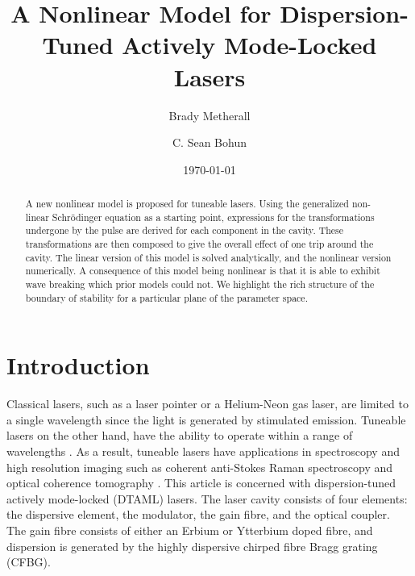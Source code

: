 \documentclass[%
 aps,
 jmp,%
 amsmath,amssymb,
 reprint,%
nofootinbib
]{revtex4-1}
\begin{document}

\title[]{A Nonlinear Model for Dispersion-Tuned Actively Mode-Locked Lasers}%

\author{Brady Metherall}
\author{C. Sean Bohun}%

\date{\today}%

\begin{abstract}
A new nonlinear model is proposed for tuneable lasers. Using the generalized non-linear Schr\"{o}dinger equation as a starting point, expressions for the transformations undergone by the pulse are derived for each component in the cavity. These transformations are then composed to give the overall effect of one trip around the cavity. The linear version of this model is solved analytically, and the nonlinear version numerically. A consequence of this model being nonlinear is that it is able to exhibit wave breaking which prior models could not. We highlight the rich structure of the boundary of stability for a particular plane of the parameter space.
\end{abstract}

\maketitle

\section{Introduction}
Classical lasers, such as a laser pointer or a Helium-Neon gas laser, are limited to a single wavelength since the light is generated by stimulated emission. Tuneable lasers on the other hand, have the ability to operate within a range of wavelengths \cite{bohun, burgoyne2010, yamashita}. As a result, tuneable lasers have applications in spectroscopy and high resolution imaging such as coherent anti-Stokes Raman spectroscopy and optical coherence tomography \cite{bohun, burgoyne2014, yamashita}. This article is concerned with dispersion-tuned actively mode-locked (DTAML) lasers. The laser cavity consists of four elements: the dispersive element, the modulator, the gain fibre, and the optical coupler. The gain fibre consists of either an Erbium or Ytterbium doped fibre, and dispersion is generated by the highly dispersive chirped fibre Bragg grating (CFBG). \\
\end{document}
